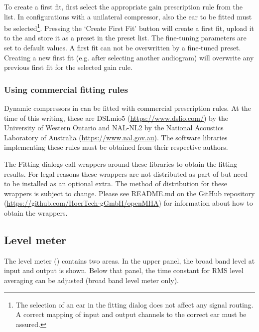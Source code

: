\documentclass[11pt,a4paper,twoside]{article}
\newcommand{\+}{\discretionary{\mbox{\scriptsize$\hookleftarrow$}}{}{}}
\begin{document}
To create a first fit, first select the appropriate gain prescription
rule from the list. In \mha{} configurations with a unilateral
compressor, also the ear to be fitted must be selected\footnote{The
  selection of an ear in the fitting dialog does not affect any signal
  routing. A correct mapping of \mha{} input and output channels to the
  correct ear must be assured.}. Pressing the `Create First Fit'
button will create a first fit, upload it to the \mha{} and store it as a
preset in the preset list. The fine-tuning parameters are set to
default values.  A first fit can not be overwritten by a fine-tuned
preset.  Creating a new first fit (e.g. after selecting another
audiogram) will overwrite any previous first fit for the selected gain
rule.


\subsubsection*{Using commercial fitting rules}

Dynamic compressors in \mha{} can be fitted with commercial prescription rules. At
the time of this writing, these are DSLmio5 (\url{https://www.dslio.com/}) by
the University of Western Ontario and NAL-NL2 by the National Acoustics
Laboratory of Australia (\url{https://www.nal.gov.au}). The software libraries
implementing these rules must be obtained from their respective authors.

The \mha{} Fitting dialogs call wrappers around these libraries to obtain the
fitting results. For legal reasons these wrappers are not distributed as part of
\mha{} but need to be installed as an optional extra. The method of distribution
for these wrappers is subject to change. Please see README.md on the \mha{}
GitHub repository (\url{https://github.com/HoerTech-gGmbH/openMHA})
for information about how to obtain the wrappers.

\subsection{Level meter}\label{sec:levels}

The level meter () contains two areas.
%
In the upper panel, the broad band level at input and output is shown.
%
Below that panel, the time constant for RMS level averaging can be
adjusted (broad band level meter only).
\end{document}
